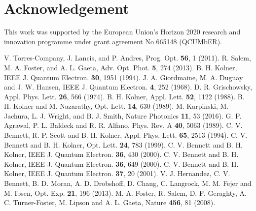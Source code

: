 \documentclass[10pt,twocolumn]{article}
\begin{document}
\section*{Acknowledgement}
This work was supported by the European Union's Horizon 2020 research and innovation programme under grant agreement No 665148 (QCUMbER).

\smallskip
\smallskip
\smallskip


\begin{thebibliography}{99}
V. Torres-Company, J. Lancis, and P. Andres, Prog. Opt. \textbf{56}, 1 (2011).
R. Salem, M. A. Foster, and A. L. Gaeta, Adv. Opt. Phot. \textbf{5}, 274 (2013).
 B. H. Kolner, IEEE J. Quantum Electron. \textbf{30}, 1951 (1994).
 J. A. Giordmaine, M. A. Duguay and J. W. Hansen, IEEE J. Quantum Electron. \textbf{4}, 252 (1968).
 D. R. Grischowsky, Appl. Phys. Lett. \textbf{26}, 566 (1974).
 B. H. Kolner, Appl. Lett. \textbf{52}, 1122 (1988).
 B. H. Kolner and M. Nazarathy, Opt. Lett. \textbf{14}, 630 (1989).
 M. Karpinski, M. Jachura, L. J. Wright, and B. J. Smith,  Nature Photonics \textbf{11},
    53 (2016).
 G. P. Agrawal, P. L. Baldeck and R. R. Alfano, Phys. Rev. A \textbf{40}, 5063 (1989).
 C. V. Bennett, R. P. Scott and B. H. Kolner, Appl. Phys. Lett. \textbf{65}, 2513 (1994).
 C. V. Bennett and B. H. Kolner, Opt. Lett. \textbf{24}, 783 (1999).
 C. V. Bennett and B. H. Kolner, IEEE J. Quantum Electron. \textbf{36}, 430 (2000).
 C. V. Bennett and B. H. Kolner, IEEE J. Quantum Electron. \textbf{36}, 649 (2000).
 C. V. Bennett and B. H. Kolner, IEEE J. Quantum Electron. \textbf{37}, 20 (2001).
 V. J. Hernandez, C. V. Bennett, B. D. Moran, A. D. Drobshoff, D. Chang, C. Langrock, M. M. Fejer and M. Ibsen, Opt. Exp. \textbf{21}, 196 (2013).
 M. A. Foster, R. Salem, D. F. Geraghty, A. C. Turner-Foster, M. Lipson and A. L. Gaeta, Nature \textbf{456}, 81 (2008).

\end{thebibliography}
\end{document}
